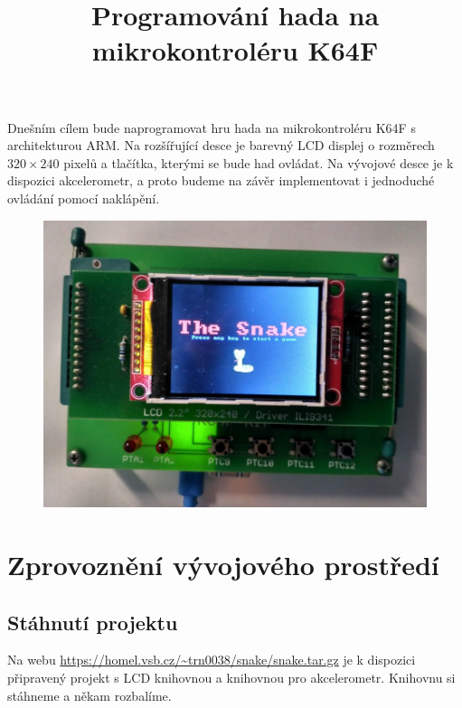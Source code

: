 \documentclass[12pt]{article}
\title{Programování hada na mikrokontroléru K64F}
\date{}
\begin{document}
\sloppy
\maketitle

Dnešním cílem bude naprogramovat hru hada na mikrokontroléru K64F s architekturou ARM.
Na rozšířující desce je barevný LCD displej o rozměrech $320 \times 240$ pixelů a tlačítka, kterými se bude had ovládat.
Na vývojové desce je k dispozici akcelerometr, a proto budeme na závěr implementovat i jednoduché ovládání pomocí naklápění.

\begin{figure}[h]
\includegraphics[width=\linewidth]{figures/snake}
\end{figure}




\section{Zprovoznění vývojového prostředí}
\subsection{Stáhnutí projektu}
Na webu \url{https://homel.vsb.cz/~trn0038/snake/snake.tar.gz} je k dispozici připravený projekt s LCD knihovnou a knihovnou pro akcelerometr.
Knihovnu si stáhneme a někam rozbalíme.
\end{document}
